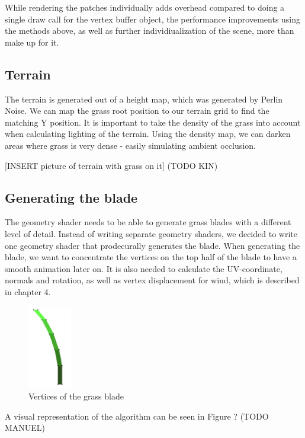 \documentclass[conference]{acmsiggraph}
\begin{document}
While rendering the patches individually adds overhead compared to doing a single draw call for the vertex buffer object, the performance improvements using the methods above, as well as further individiualization of the scene, more than make up for it.

\subsection{Terrain}
The terrain is generated out of a height map, which was generated by Perlin Noise. We can map the grass root position to our terrain grid to find the matching Y position. It is important to take the density of the grass into account when calculating lighting of the terrain. Using the density map, we can darken areas where grass is very dense - easily simulating ambient occlusion.

[INSERT picture of terrain with grass on it] (TODO KIN)

\subsection{Generating the blade}
The geometry shader needs to be able to generate grass blades with a different level of detail. Instead of writing separate geometry shaders, we decided to write one geometry shader that prodecurally generates the blade. When generating the blade, we want to concentrate the vertices on the top half of the blade to have a smooth animation later on. It is also needed to calculate the UV-coordinate, normals and rotation, as well as vertex displacement for wind, which is described in chapter 4.

 \begin{figure}[ht]
   \centering
   \includegraphics[width=0.75in]{images/grass_blade_vertices}
   \caption{Vertices of the grass blade}
 \end{figure}

A visual representation of the algorithm can be seen in Figure {?} (TODO MANUEL)
\end{document}

